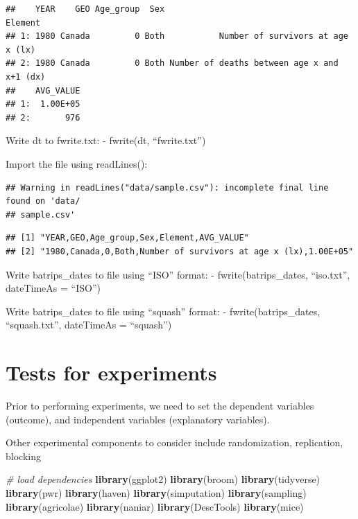 \documentclass[]{book}
\newenvironment{Shaded}{\begin{snugshade}}{\end{snugshade}}
\newcommand{\CommentTok}[1]{\textcolor[rgb]{0.56,0.35,0.01}{\textit{#1}}}
\newcommand{\DecValTok}[1]{\textcolor[rgb]{0.00,0.00,0.81}{#1}}
\newcommand{\KeywordTok}[1]{\textcolor[rgb]{0.13,0.29,0.53}{\textbf{#1}}}
\newcommand{\NormalTok}[1]{#1}
\newcommand{\OperatorTok}[1]{\textcolor[rgb]{0.81,0.36,0.00}{\textbf{#1}}}
\newcommand{\StringTok}[1]{\textcolor[rgb]{0.31,0.60,0.02}{#1}}
\begin{document}
\begin{verbatim}
##    YEAR    GEO Age_group  Sex                                     Element
## 1: 1980 Canada         0 Both           Number of survivors at age x (lx)
## 2: 1980 Canada         0 Both Number of deaths between age x and x+1 (dx)
##    AVG_VALUE
## 1:  1.00E+05
## 2:       976
\end{verbatim}

Write dt to fwrite.txt:
- fwrite(dt, ``fwrite.txt'')

Import the file using readLines():

\begin{Shaded}
\end{Shaded}

\begin{verbatim}
## Warning in readLines("data/sample.csv"): incomplete final line found on 'data/
## sample.csv'
\end{verbatim}

\begin{verbatim}
## [1] "YEAR,GEO,Age_group,Sex,Element,AVG_VALUE"                     
## [2] "1980,Canada,0,Both,Number of survivors at age x (lx),1.00E+05"
\end{verbatim}

Write batrips\_dates to file using ``ISO'' format:
- fwrite(batrips\_dates, ``iso.txt'', dateTimeAs = ``ISO'')

Write batrips\_dates to file using ``squash'' format:
- fwrite(batrips\_dates, ``squash.txt'', dateTimeAs = ``squash'')

\hypertarget{tests-for-experiments}{%
\chapter{Tests for experiments}\label{tests-for-experiments}}

Prior to performing experiments, we need to set the dependent variables (outcome), and independent variables (explanatory variables).

Other experimental components to consider include randomization, replication, blocking

\begin{Shaded}
\begin{Highlighting}[]
\CommentTok{# load dependencies}
\KeywordTok{library}\NormalTok{(ggplot2) }
\KeywordTok{library}\NormalTok{(broom)}
\KeywordTok{library}\NormalTok{(tidyverse)}
\KeywordTok{library}\NormalTok{(pwr)}
\KeywordTok{library}\NormalTok{(haven)}
\KeywordTok{library}\NormalTok{(simputation)}
\KeywordTok{library}\NormalTok{(sampling)}
\KeywordTok{library}\NormalTok{(agricolae)}
\KeywordTok{library}\NormalTok{(naniar)}
\KeywordTok{library}\NormalTok{(DescTools)}
\KeywordTok{library}\NormalTok{(mice)}
\end{Highlighting}
\end{Shaded}
\end{document}

